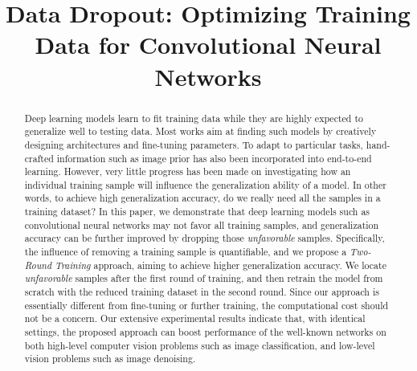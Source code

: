 \documentclass[10pt, conference, letterpaper]{IEEEtran}
\begin{document}
\title{Data Dropout: Optimizing Training Data for Convolutional Neural Networks}


\author{ 

\and
{} 

\and
{} 

}

\providecommand{\keywords}[1]{\textbf{\textit{Keywords---}} #1}

\maketitle

\begin{abstract}

Deep learning models learn to fit training data while they are highly expected to generalize well to testing data. Most works aim at finding such models by creatively designing architectures and fine-tuning parameters. To adapt to particular tasks, hand-crafted information such as image prior has also been incorporated into end-to-end learning. However, very little progress has been made on investigating how an individual training sample will influence the generalization ability of a model. In other words, to achieve high generalization accuracy, do we really need all the samples in a training dataset? In this paper, we demonstrate that deep learning models such as convolutional neural networks may not favor all training samples, and generalization accuracy can be further improved by dropping those \emph{unfavorable} samples. Specifically, the influence of removing a training sample is quantifiable, and we propose a \emph{Two-Round Training} approach, aiming to achieve higher generalization accuracy. We locate \emph{unfavorable} samples after the first round of training, and then retrain the model from scratch with the reduced training dataset in the second round. Since our approach is essentially different from fine-tuning or further training, the computational cost should not be a concern. Our extensive experimental results indicate that, with identical settings, the proposed approach can boost performance of the well-known networks on both high-level computer vision problems such as image classification, and low-level vision problems such as image denoising.

\end{abstract}
\end{document}
